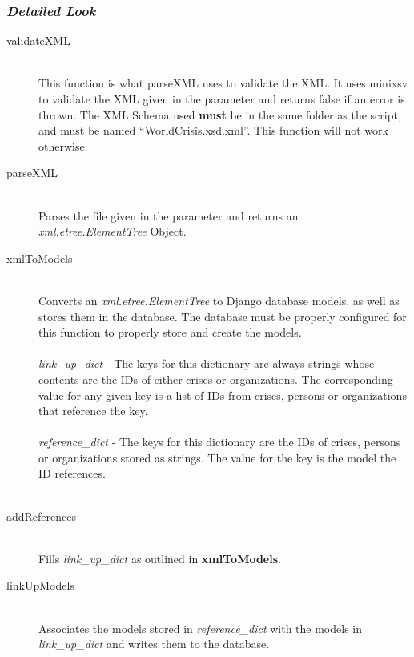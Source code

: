 \documentclass[12pt]{report}
\begin{document}
\subsubsection*{\emph{Detailed Look}}
\begin{description}
    \item[validateXML] \hfill \\
        This function is what parseXML uses to validate the XML.
        It uses minixsv to validate the XML given in the parameter and returns false if an error is thrown.
        The XML Schema used \textbf{must} be in the same folder as the script, and must be named ``WorldCrisis.xsd.xml''.
        This function will not work otherwise.\\
    \item[parseXML] \hfill \\
        Parses the file given in the parameter and returns an \emph{xml.etree.ElementTree} Object.\\
    \item[xmlToModels] \hfill \\
        Converts an \emph{xml.etree.ElementTree} to Django database models, as well as stores them in the database.
        The database must be properly configured for this function to properly store and create the models.\\\\
        \emph{link\_up\_dict} -
            The keys for this dictionary are always strings whose contents are the IDs of either crises or organizations.
            The corresponding value for any given key is a list of IDs from crises, persons or organizations that reference the key.\\\\
        \emph{reference\_dict} - 
            The keys for this dictionary are the IDs of crises, persons or organizations stored as strings.
            The value for the key is the model the ID references.\\\\
    \item[addReferences] \hfill \\
        Fills \emph{link\_up\_dict} as outlined in \textbf{xmlToModels}.\\


    \item[linkUpModels] \hfill \\
        Associates the models stored in \emph{reference\_dict} with the models in \emph{link\_up\_dict} and writes them to the database.
\end{description}
\end{document}
